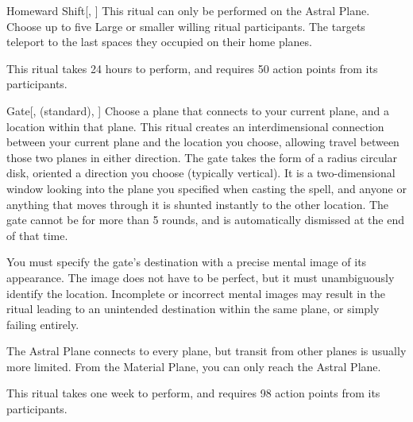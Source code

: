 \lowercase{\hypertarget{spell:Homeward Shift}{}}\label{spell:Homeward Shift}
\begin{freeability}[\nth{5}]{\hypertarget{spell:Homeward Shift}{Homeward Shift}}[, ]
This ritual can only be performed on the Astral Plane.
Choose up to five Large or smaller willing ritual participants.
The targets teleport to the last spaces they occupied on their home planes.

This ritual takes 24 hours to perform, and requires 50 action points from its participants.
\end{freeability}
\vspace{0.25em}



\lowercase{\hypertarget{spell:Gate}{}}\label{spell:Gate}
\begin{freeability}[\nth{7}]{\hypertarget{spell:Gate}{Gate}}[,  (standard), ]
Choose a plane that connects to your current plane, and a location within that plane.
This ritual creates an interdimensional connection between your current plane and the location you choose, allowing travel between those two planes in either direction.
The gate takes the form of a \areasmall radius circular disk, oriented a direction you choose (typically vertical).
It is a two-dimensional window looking into the plane you specified when casting the spell, and anyone or anything that moves through it is shunted instantly to the other location.
The gate cannot be  for more than 5 rounds, and is automatically dismissed at the end of that time.

You must specify the gate's destination with a precise mental image of its appearance.
The image does not have to be perfect, but it must unambiguously identify the location.
Incomplete or incorrect mental images may result in the ritual leading to an unintended destination within the same plane, or simply failing entirely.

The Astral Plane connects to every plane, but transit from other planes is usually more limited.
From the Material Plane, you can only reach the Astral Plane.

This ritual takes one week to perform, and requires 98 action points from its participants.
\end{freeability}
\vspace{0.25em}


